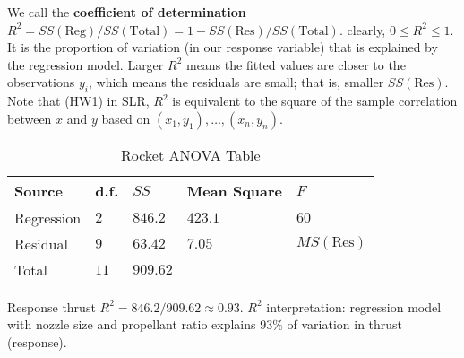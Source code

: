 We call the \textbf{coefficient of determination}
$ R^2 = SS(\text{Reg})/SS(\text{Total})=1-SS(\text{Res})/SS(\text{Total}) $.
clearly, $ 0\leqslant R^2\leqslant 1 $. It is the proportion
of variation (in our response variable) that is explained
by the regression model. Larger $ R^2 $ means
the fitted values are closer to the observations $ y_i $,
which means the residuals are small; that is, smaller $ SS(\text{Res}) $.
Note that (HW1) in SLR, $ R^2 $ is equivalent to the square of
the sample correlation between $ x $ and $ y $
based on $ (x_1,y_1),\ldots,(x_n,y_n) $.

\begin{table}[H]
    \centering
    \caption{Rocket ANOVA Table}
    \begin{tabu} to 0.9\textwidth {Y[0.5]YYY[2]Y}
        \toprule
        Source     & d.f.   & $ SS $     & Mean Square & $ F $              \\
        \midrule
        Regression & $ 2 $  & $ 846.2 $  & $ 423.1 $   & $ 60 $             \\
        Residual   & $ 9 $  & $ 63.42 $  & $ 7.05 $    & $ MS(\text{Res}) $ \\
        \midrule
        Total      & $ 11 $ & $ 909.62 $                                    \\
        \bottomrule
    \end{tabu}
\end{table}
Response thrust
$ R^2=846.2/909.62 \approx 0.93 $. $ R^2 $
interpretation: regression model with nozzle size and propellant ratio
explains $ 93\% $ of variation in thrust (response).
